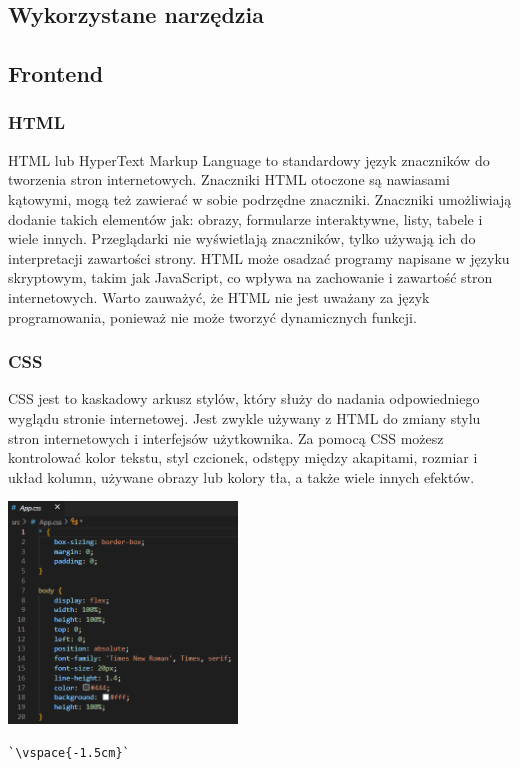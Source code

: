 \documentclass[10pt,a4paper]{report}
\begin{document}
\begin{adjustwidth}{2cm}{2cm}
\chapter{Wykorzystane narzędzia}
\section{Frontend}
\subsection{HTML}
\begin{minipage}{1\linewidth}
HTML lub HyperText Markup Language to standardowy język znaczników do tworzenia stron internetowych. Znaczniki HTML otoczone są nawiasami kątowymi, mogą też zawierać w sobie podrzędne znaczniki. Znaczniki umożliwiają dodanie takich elementów jak: obrazy, formularze interaktywne, listy, tabele i wiele innych. Przeglądarki nie wyświetlają znaczników, tylko używają ich do interpretacji zawartości strony. HTML może osadzać programy napisane w języku skryptowym, takim jak JavaScript, co wpływa na zachowanie i zawartość stron internetowych. Warto zauważyć, że HTML nie jest uważany za język programowania, ponieważ nie może tworzyć dynamicznych funkcji. 
\end{minipage}
\subsection{CSS}
\begin{minipage}{1\linewidth}
CSS jest to kaskadowy arkusz stylów, który służy do nadania odpowiedniego wyglądu stronie internetowej. Jest zwykle używany z HTML do zmiany stylu stron internetowych i interfejsów użytkownika. Za pomocą CSS możesz kontrolować kolor tekstu, styl czcionek, odstępy między akapitami, rozmiar i układ kolumn, używane obrazy lub kolory tła, a także wiele innych efektów. \\
\end{minipage}
\begin{center}
\includegraphics[width=230px]{img/css}
\begin{lstlisting}[escapeinside=``,caption={Przykładowe użycie CSS w projekcie}]
`\vspace{-1.5cm}`
\end{lstlisting}
\end{center}
\vspace{0.1cm}

\end{adjustwidth}
\end{document}
